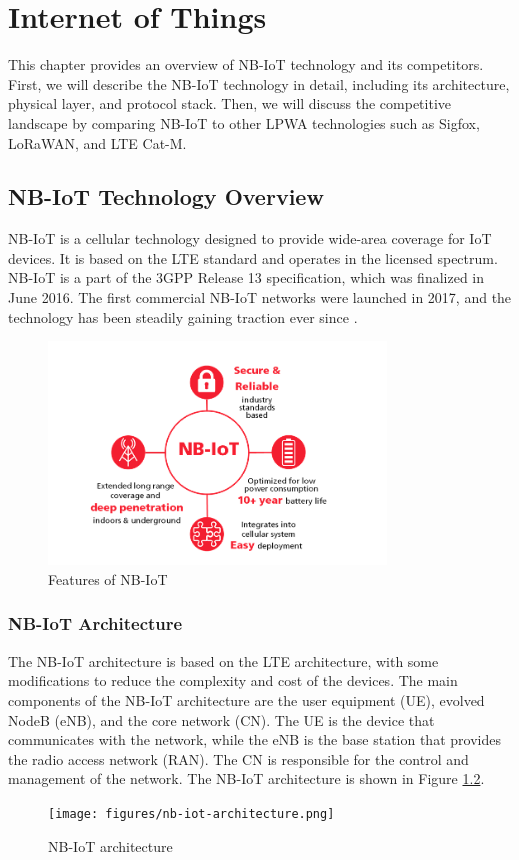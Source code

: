 \chapter{Internet of Things}
This chapter provides an overview of NB-IoT technology and its competitors. First, we will describe the NB-IoT technology in detail, including its architecture, physical layer, and protocol stack. Then, we will discuss the competitive landscape by comparing NB-IoT to other LPWA technologies such as Sigfox, LoRaWAN, and LTE Cat-M.

\section{NB-IoT Technology Overview}
NB-IoT is a cellular technology designed to provide wide-area coverage for IoT devices. It is based on the LTE standard and operates in the licensed spectrum. NB-IoT is a part of the 3GPP Release 13 specification, which was finalized in June 2016. The first commercial NB-IoT networks were launched in 2017, and the technology has been steadily gaining traction ever since \cite{ubox}.

\begin{figure}[h]
    \centering
    \includegraphics[width=0.8\textwidth]{pict/nb-iot.png}
    \caption{Features of NB-IoT \cite{ubox}}
    \label{fig:features-of-nb_iot}
\end{figure}

\subsection{NB-IoT Architecture}
The NB-IoT architecture is based on the LTE architecture, with some modifications to reduce the complexity and cost of the devices. The main components of the NB-IoT architecture are the user equipment (UE), evolved NodeB (eNB), and the core network (CN). The UE is the device that communicates with the network, while the eNB is the base station that provides the radio access network (RAN). The CN is responsible for the control and management of the network. The NB-IoT architecture is shown in Figure \ref{fig:nb-iot-architecture}.
\begin{figure}[ht]
    \centering
    \texttt{[image: figures/nb-iot-architecture.png]}
    \caption{NB-IoT architecture \cite{nb-iot-architecture}}
    \label{fig:nb-iot-architecture}
\end{figure}

